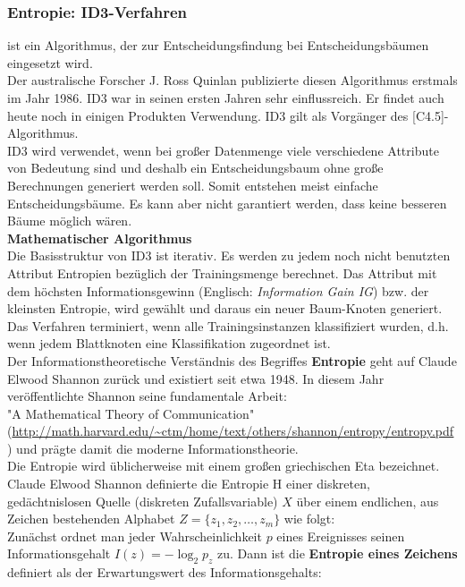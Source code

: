 \documentclass[12pt]{article}
\begin{document}
\subsubsection{Entropie: ID3-Verfahren}
%
{\color{blue}{Iterative Dichotomiser3 (ID3)}}  ist ein Algorithmus, der zur Entscheidungsfindung bei Entscheidungsbäumen eingesetzt wird.\\
Der australische Forscher J. Ross Quinlan publizierte diesen Algorithmus erstmals im Jahr 1986. ID3 war in seinen ersten Jahren sehr einflussreich. Er findet auch heute noch in einigen Produkten Verwendung. ID3 gilt als Vorgänger des [C4.5]-Algorithmus.\\
%
ID3 wird verwendet, wenn bei großer Datenmenge viele verschiedene Attribute von Bedeutung sind und deshalb ein Entscheidungsbaum ohne große Berechnungen generiert werden soll. Somit entstehen meist einfache Entscheidungsbäume. Es kann aber nicht garantiert werden, dass keine besseren Bäume möglich wären.\\[0.2cm]
%
\textbf{Mathematischer Algorithmus} \\[0.2cm]
Die Basisstruktur von ID3 ist iterativ. Es werden zu jedem noch nicht benutzten Attribut Entropien bezüglich der Trainingsmenge berechnet. Das Attribut mit dem höchsten Informationsgewinn (Englisch: \textit{Information Gain IG}) bzw. der kleinsten Entropie, wird gewählt und daraus ein neuer Baum-Knoten generiert.\\[0.1cm]
Das Verfahren terminiert, wenn alle Trainingsinstanzen klassifiziert wurden, d.h. wenn jedem Blattknoten eine Klassifikation zugeordnet ist.\\[0.1cm]
Der Informationstheoretische Verständnis des Begriffes \textbf {Entropie} geht auf Claude Elwood Shannon zurück und existiert seit etwa 1948. In diesem Jahr veröffentlichte Shannon seine fundamentale Arbeit:\\
 "A Mathematical Theory of Communication" (\url{http://math.harvard.edu/~ctm/home/text/others/shannon/entropy/entropy.pdf}) und prägte damit die moderne Informationstheorie.\\
% 
Die Entropie wird üblicherweise mit einem großen griechischen Eta   bezeichnet. Claude Elwood Shannon definierte die Entropie $ \mathrm{H} $ einer diskreten, gedächtnislosen Quelle (diskreten Zufallsvariable) $ X $ über einem endlichen, aus Zeichen bestehenden Alphabet $ Z=\{z_1, z_2, \dots, z_m\}$ wie folgt:\\[0.2cm]
Zunächst ordnet man jeder Wahrscheinlichkeit $ p $ eines Ereignisses seinen Informationsgehalt $ I(z) = -\log_2 p_z $ zu. Dann ist die \textbf{Entropie eines Zeichens} definiert als der Erwartungswert des Informationsgehalts: \
\end{document}
